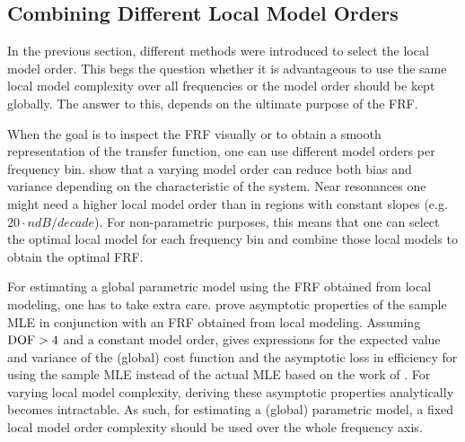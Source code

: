 \subsection{Combining Different Local Model Orders}
In the previous section, different methods were introduced to select the local model order.
This begs the question whether it is advantageous to use the same local model complexity over all frequencies or the model order should be kept globally.
The answer to this, depends on the ultimate purpose of the \gls{FRF}.

When the goal is to inspect the \gls{FRF} visually or to obtain a smooth representation of the transfer function, one can use different model orders per frequency bin.
 show that a varying model order can reduce both bias and variance depending on the characteristic of the system.
Near resonances one might need a higher local model order than in regions with constant slopes (e.g. $20\cdot n \unit{dB/decade}$).
For non-parametric purposes, this means that one can select the optimal local model for each frequency bin and combine those local models to obtain the optimal \gls{FRF}.

For estimating a global parametric model using the \gls{FRF} obtained from local modeling, one has to take extra care.
 prove asymptotic properties of the sample \gls{MLE} in conjunction with an \gls{FRF} obtained from local modeling.
Assuming $\mathrm{DOF} > 4$ and a constant model order, \citet{Pintelon2010LPM2} gives expressions for the expected value and variance of the (global) cost function and the asymptotic loss in efficiency for using the sample \gls{MLE} instead of the actual \gls{MLE} based on the work of \citet{Mahata2006}.
For varying local model complexity, deriving these asymptotic properties analytically becomes intractable.
As such, for estimating a (global) parametric model, a fixed local model order complexity should be used over the whole frequency axis.

